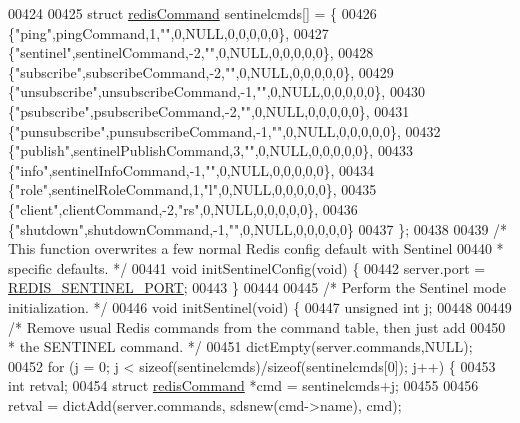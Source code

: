 \begin{DoxyCode}
00424 
00425 \textcolor{keyword}{struct} \hyperlink{structredisCommand}{redisCommand} sentinelcmds[] = \{
00426     \{\textcolor{stringliteral}{"ping"},pingCommand,1,\textcolor{stringliteral}{""},0,NULL,0,0,0,0,0\},
00427     \{\textcolor{stringliteral}{"sentinel"},sentinelCommand,-2,\textcolor{stringliteral}{""},0,NULL,0,0,0,0,0\},
00428     \{\textcolor{stringliteral}{"subscribe"},subscribeCommand,-2,\textcolor{stringliteral}{""},0,NULL,0,0,0,0,0\},
00429     \{\textcolor{stringliteral}{"unsubscribe"},unsubscribeCommand,-1,\textcolor{stringliteral}{""},0,NULL,0,0,0,0,0\},
00430     \{\textcolor{stringliteral}{"psubscribe"},psubscribeCommand,-2,\textcolor{stringliteral}{""},0,NULL,0,0,0,0,0\},
00431     \{\textcolor{stringliteral}{"punsubscribe"},punsubscribeCommand,-1,\textcolor{stringliteral}{""},0,NULL,0,0,0,0,0\},
00432     \{\textcolor{stringliteral}{"publish"},sentinelPublishCommand,3,\textcolor{stringliteral}{""},0,NULL,0,0,0,0,0\},
00433     \{\textcolor{stringliteral}{"info"},sentinelInfoCommand,-1,\textcolor{stringliteral}{""},0,NULL,0,0,0,0,0\},
00434     \{\textcolor{stringliteral}{"role"},sentinelRoleCommand,1,\textcolor{stringliteral}{"l"},0,NULL,0,0,0,0,0\},
00435     \{\textcolor{stringliteral}{"client"},clientCommand,-2,\textcolor{stringliteral}{"rs"},0,NULL,0,0,0,0,0\},
00436     \{\textcolor{stringliteral}{"shutdown"},shutdownCommand,-1,\textcolor{stringliteral}{""},0,NULL,0,0,0,0,0\}
00437 \};
00438 
00439 \textcolor{comment}{/* This function overwrites a few normal Redis config default with Sentinel}
00440 \textcolor{comment}{ * specific defaults. */}
00441 \textcolor{keywordtype}{void} initSentinelConfig(\textcolor{keywordtype}{void}) \{
00442     server.port = \hyperlink{sentinel_8c_a4c51b961e51b0dd04260eb860e641b2f}{REDIS\_SENTINEL\_PORT};
00443 \}
00444 
00445 \textcolor{comment}{/* Perform the Sentinel mode initialization. */}
00446 \textcolor{keywordtype}{void} initSentinel(\textcolor{keywordtype}{void}) \{
00447     \textcolor{keywordtype}{unsigned} \textcolor{keywordtype}{int} j;
00448 
00449     \textcolor{comment}{/* Remove usual Redis commands from the command table, then just add}
00450 \textcolor{comment}{     * the SENTINEL command. */}
00451     dictEmpty(server.commands,NULL);
00452     \textcolor{keywordflow}{for} (j = 0; j < \textcolor{keyword}{sizeof}(sentinelcmds)/\textcolor{keyword}{sizeof}(sentinelcmds[0]); j++) \{
00453         \textcolor{keywordtype}{int} retval;
00454         \textcolor{keyword}{struct} \hyperlink{structredisCommand}{redisCommand} *cmd = sentinelcmds+j;
00455 
00456         retval = dictAdd(server.commands, sdsnew(cmd->name), cmd);

\end{DoxyCode}

